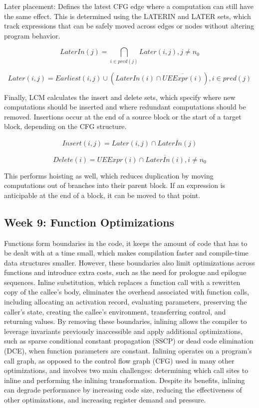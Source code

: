 \documentclass[11pt, a4paper, titlepage]{article}
\begin{document}
Later placement: Defines the latest CFG edge where a computation can still have the same effect. This is determined using the LATERIN and LATER sets, which track expressions that can be safely moved across edges or nodes without altering program behavior.

\[LaterIn(j) = \bigcap_{i \in pred(j)} Later(i,j), j \neq n_{0}\]

\[Later(i,j) = Earliest(i, j) \cup (LaterIn(i) \cap \overline{UEExpr(i)}), i \in pred(j)\]

Finally, LCM calculates the insert and delete sets, which specify where new computations should be inserted and where redundant computations should be removed. Insertions occur at the end of a source block or the start of a target block, depending on the CFG structure.

\[Insert(i,j)=Later(i,j) \cap \overline{LaterIn(j)}\]

\[Delete(i)=UEExpr(i) \cap \overline{LaterIn(i)}, i \neq n_{0}\]

This performs hoisting as well, which reduces duplication by moving computations out of branches into their parent block.
If an expression is anticipable at the end of a block, it can be moved to that point.

\subsection{Week 9: Function Optimizations}

Functions form boundaries in the code, it keeps the amount of code that has to be dealt with at a time small, which makes compilation faster and compile-time data structures smaller. However, these boundaries also limit optimizations across functions and introduce extra costs, such as the need for prologue and epilogue sequences. Inline substitution, which replaces a function call with a rewritten copy of the callee’s body, eliminates the overhead associated with function calls, including allocating an activation record, evaluating parameters, preserving the caller's state, creating the callee’s environment, transferring control, and returning values. By removing these boundaries, inlining allows the compiler to leverage invariants previously inaccessible and apply additional optimizations, such as sparse conditional constant propagation (SSCP) or dead code elimination (DCE), when function parameters are constant. Inlining operates on a program’s call graph, as opposed to the control flow graph (CFG) used in many other optimizations, and involves two main challenges: determining which call sites to inline and performing the inlining transformation. Despite its benefits, inlining can degrade performance by increasing code size, reducing the effectiveness of other optimizations, and increasing register demand and pressure.
\end{document}
